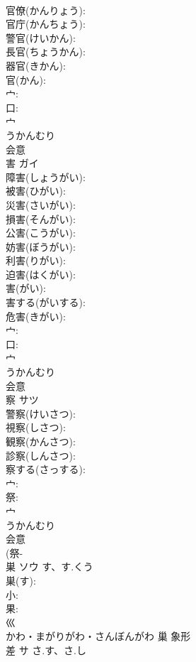 \documentclass[8pt]{extreport}
\begin{document}
\begin{CJK}{UTF8}{min}
\\	官僚(かんりょう): 
\\	官庁(かんちょう): 
\\	警官(けいかん): 
\\	長官(ちょうかん): 
\\	器官(きかん): 
\\	官(かん): 
\\	宀: 
\\	口: 
\\	宀	
\\	うかんむり	
\\	会意 
\\	害	ガイ			
\\	障害(しょうがい): 
\\	被害(ひがい): 
\\	災害(さいがい): 
\\	損害(そんがい): 
\\	公害(こうがい): 
\\	妨害(ぼうがい): 
\\	利害(りがい): 
\\	迫害(はくがい): 
\\	害(がい): 
\\	害する(がいする): 
\\	危害(きがい): 
\\	宀: 
\\	口: 
\\	宀	
\\	うかんむり	
\\	会意 
\\	察	サツ			
\\	警察(けいさつ): 
\\	視察(しさつ): 
\\	観察(かんさつ): 
\\	診察(しんさつ): 
\\	察する(さっする): 
\\	宀: 
\\	祭: 
\\	宀	
\\	うかんむり	
\\	会意 
\\	(祭-
\\	巣	ソウ	す、す.くう		
\\	巣(す): 
\\	小: 
\\	果: 
\\	巛	
\\	かわ・まがりがわ・さんぼんがわ	巢	象形 
\\	差	サ	さ.す、さ.し		

\end{CJK}
\end{document}
